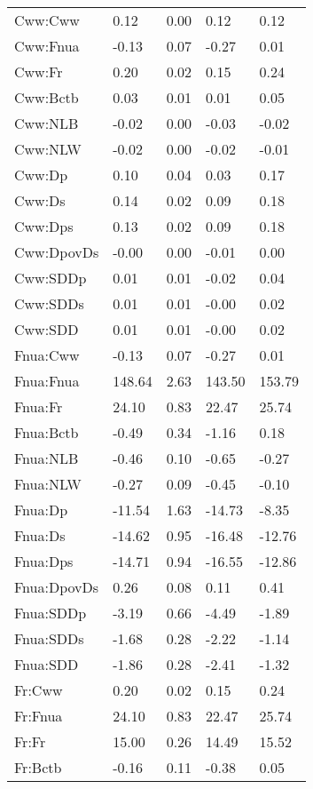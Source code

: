 \begin{center}
\begin{longtable}{|p{0.9in}|p{0.7in}|p{0.7in}|p{0.7in}|p{0.7in}|}
  Cww:Cww & 0.12 & 0.00 & 0.12 & 0.12 \\ 
    Cww:Fnua & -0.13 & 0.07 & -0.27 & 0.01 \\ 
    Cww:Fr & 0.20 & 0.02 & 0.15 & 0.24 \\ 
    Cww:Bctb & 0.03 & 0.01 & 0.01 & 0.05 \\ 
    Cww:NLB & -0.02 & 0.00 & -0.03 & -0.02 \\ 
    Cww:NLW & -0.02 & 0.00 & -0.02 & -0.01 \\ 
    Cww:Dp & 0.10 & 0.04 & 0.03 & 0.17 \\ 
    Cww:Ds & 0.14 & 0.02 & 0.09 & 0.18 \\ 
    Cww:Dps & 0.13 & 0.02 & 0.09 & 0.18 \\ 
    Cww:DpovDs & -0.00 & 0.00 & -0.01 & 0.00 \\ 
    Cww:SDDp & 0.01 & 0.01 & -0.02 & 0.04 \\ 
    Cww:SDDs & 0.01 & 0.01 & -0.00 & 0.02 \\ 
    Cww:SDD & 0.01 & 0.01 & -0.00 & 0.02 \\ 
    Fnua:Cww & -0.13 & 0.07 & -0.27 & 0.01 \\ 
    Fnua:Fnua & 148.64 & 2.63 & 143.50 & 153.79 \\ 
    Fnua:Fr & 24.10 & 0.83 & 22.47 & 25.74 \\ 
    Fnua:Bctb & -0.49 & 0.34 & -1.16 & 0.18 \\ 
    Fnua:NLB & -0.46 & 0.10 & -0.65 & -0.27 \\ 
    Fnua:NLW & -0.27 & 0.09 & -0.45 & -0.10 \\ 
    Fnua:Dp & -11.54 & 1.63 & -14.73 & -8.35 \\ 
    Fnua:Ds & -14.62 & 0.95 & -16.48 & -12.76 \\ 
    Fnua:Dps & -14.71 & 0.94 & -16.55 & -12.86 \\ 
    Fnua:DpovDs & 0.26 & 0.08 & 0.11 & 0.41 \\ 
    Fnua:SDDp & -3.19 & 0.66 & -4.49 & -1.89 \\ 
    Fnua:SDDs & -1.68 & 0.28 & -2.22 & -1.14 \\ 
    Fnua:SDD & -1.86 & 0.28 & -2.41 & -1.32 \\ 
    Fr:Cww & 0.20 & 0.02 & 0.15 & 0.24 \\ 
    Fr:Fnua & 24.10 & 0.83 & 22.47 & 25.74 \\ 
    Fr:Fr & 15.00 & 0.26 & 14.49 & 15.52 \\ 
    Fr:Bctb & -0.16 & 0.11 & -0.38 & 0.05 \\ 

\end{longtable}
\end{center}
